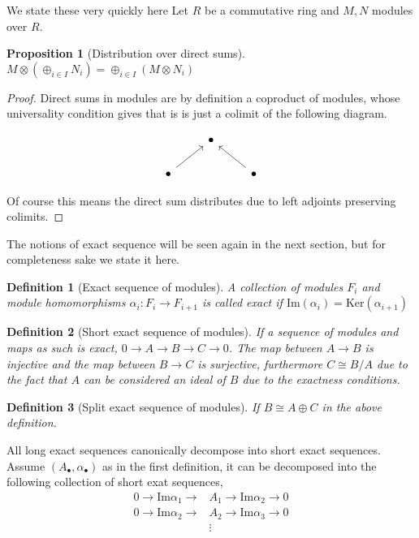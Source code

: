 \documentclass[12pt]{article}
\numberwithin{equation}{section}
\newtheorem{definition}{Definition}[section]
\newtheorem{proposition}{Proposition}[section]
\begin{document}
	We state these very quickly here
	Let $R$ be a commutative ring and $M,N$ modules over $R$.
	\begin{proposition}[Distribution over direct sums]
		\( M \otimes (\oplus_{i \in I}N_i) = \oplus_{i \in I} (M \otimes N_i)\)
	\end{proposition}
	\begin{proof}
		Direct sums in modules are by definition a coproduct of modules, whose universality condition gives that is is just a colimit of the following diagram.
		
		\[\begin{tikzcd}
			& \bullet \\
			\bullet && \bullet
			\arrow[from=2-1, to=1-2]
			\arrow[from=2-3, to=1-2]
		\end{tikzcd}\]
		
		Of course this means the direct sum distributes due to left adjoints preserving colimits.
	\end{proof}
	The notions of exact sequence will be seen again in the next section, but for completeness sake we state it here.
	\begin{definition}[Exact sequence of modules]
		A collection of modules $F_i$ and module homomorphisms $\alpha_i: F_i \to F_{i+1}$ is called exact if $\mathrm{Im}(\alpha_i) = \mathrm{Ker}(\alpha_{i+1})$
	\end{definition}
	\begin{definition}[Short exact sequence of modules] 
		If a sequence of modules and maps as such is exact, $0 \to A \to B \to C \to 0$. The map between $A \to B$ is injective and the map between $B \to C $ is surjective, furthermore $C \cong B/A$ due to the fact that $A $ can be considered an ideal of $B$ due to the exactness conditions.
		
	\end{definition}
		\begin{definition}[Split exact sequence of modules]
		If $B\cong A\oplus C$ in the above definition.
	\end{definition}
	All long exact sequences canonically decompose into short exact sequences. Assume $(A_\bullet, \alpha_\bullet)$ as in the first definition, it can be decomposed into the following collection of short exat sequences,
	\begin{align*}
		0 \to \mathrm{Im}\alpha_1 \to &A_1 \to \mathrm{Im} \alpha_2 \to 0\\
		0 \to \mathrm{Im} \alpha_2 \to &A_2 \to \mathrm{Im} \alpha_3 \to 0\\
		&\vdots
	\end{align*}
	
\end{document}
